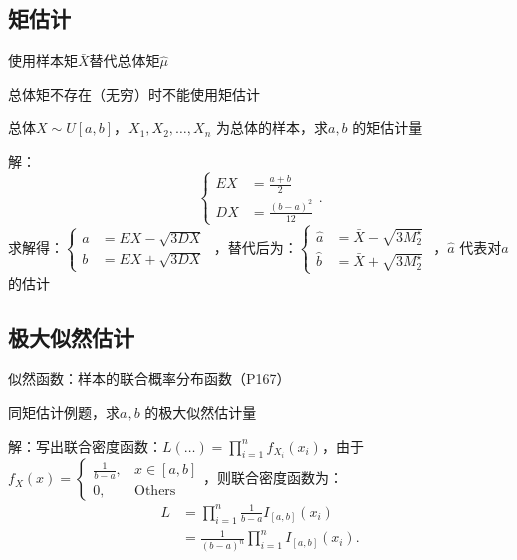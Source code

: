 \subsection{矩估计}%
\label{sub:矩估计}
使用样本矩$\bar{X}$替代总体矩$\hat{\mu}$ 
\begin{notation}
    总体矩不存在（无穷）时不能使用矩估计
\end{notation}
\begin{eg}
    总体$X\sim U[a,b]$，$X_1,X_2,\ldots ,X_{n}$ 为总体的样本，求$a,b$ 的矩估计量
\end{eg}
解：\[
    \begin{cases}
        EX&= \frac{a+b}{2} \\
        DX&= \frac{\left( b-a \right)^2 }{12}
    \end{cases}
.\]
求解得：$\begin{cases}
    a&= EX-\sqrt{3DX} \\
    b&= EX+\sqrt{3DX}
\end{cases}$ ，替代后为：$\begin{cases}
    \hat{a}&= \bar{X}-\sqrt{3M_2^\star } \\
    \hat{b}&= \bar{X}+\sqrt{3M_2^\star }
\end{cases}$ ，$\hat{a}$ 代表对$a$ 的估计
\subsection{极大似然估计}%
\label{sub:极大似然估计}
似然函数：样本的联合概率分布函数（P167）
\begin{eg}
    同矩估计例题，求$a,b$ 的极大似然估计量
\end{eg}
解：写出联合密度函数：$L\left( \ldots  \right)=\prod_{i=1}^{n} f_{X_{i}}\left( x_{i} \right)$，由于$f_X\left( x \right)=\begin{cases}
    \frac{1}{b-a},&x\in [a,b]\\
    0,&\text{Others}
\end{cases}$，则联合密度函数为：
\begin{align*}
    L&=\prod_{i=1}^{n} \frac{1}{b-a}I_{[a,b]}\left( x_{i} \right)\\
     &= \frac{1}{\left( b-a \right)^n} \prod_{i=1}^{n} I_{[a,b]}\left( x_{i} \right)
.\end{align*}
